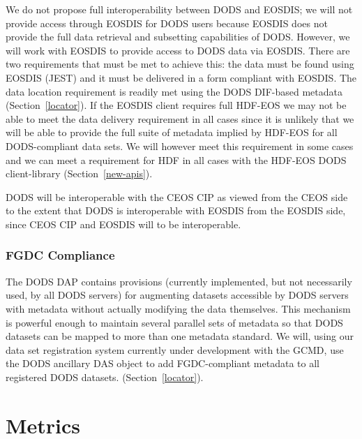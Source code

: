 \documentclass[12pt]{article}
\begin{document}
We do not propose full interoperability between \ac{DODS} and \acs{EOSDIS};
we will not provide access through \acs{EOSDIS} for \ac{DODS} users because
\acs{EOSDIS} does not provide the full data retrieval and subsetting
capabilities of \ac{DODS}.  However, we will work with \acs{EOSDIS} to
provide access to \ac{DODS} data via \acs{EOSDIS}.  There are two
requirements that must be met to achieve this: the data must be found using
\acs{EOSDIS} (JEST) and it must be delivered in a form compliant with
\acs{EOSDIS}.  The data location requirement is readily met using the
\ac{DODS} \ac{DIF}-based metadata (Section~\ref{locator}). If the
\acs{EOSDIS} client requires full \acs{HDF-EOS} we may not be able to meet
the data delivery requirement in all cases since it is unlikely that we will
be able to provide the full suite of metadata implied by \acs{HDF-EOS} for all
\ac{DODS}-compliant data sets. We
will however meet this requirement in some cases and we can meet a
requirement for \acs{HDF} in all cases with the \acs{HDF-EOS} \ac{DODS}
client-library (Section~\ref{new-apis}).

\ac{DODS} will be interoperable with the \ac{CEOS} \ac{CIP} as viewed
from the \ac{CEOS} side to the extent that \ac{DODS} is interoperable 
with \acs{EOSDIS} from the \acs{EOSDIS} side, since \ac{CEOS} \ac{CIP}
and \acs{EOSDIS} will to be interoperable.

\subsubsection{FGDC Compliance}\label{fgdc-compliance}

The \ac{DODS} \ac{DAP} contains provisions (currently implemented, 
but not necessarily used, by all \ac{DODS} servers) for augmenting 
datasets accessible by \ac{DODS} servers with metadata without actually 
modifying the data themselves.  This mechanism is powerful enough to 
maintain several parallel sets of metadata so that \ac{DODS} datasets 
can be mapped to more than one metadata standard. We will, using our 
data set registration system currently under development with the
\ac{GCMD}, use the \ac{DODS} ancillary \ac{DAS} object to add 
\ac{FGDC}-compliant metadata to all registered \ac{DODS} datasets. 
(Section~\ref{locator}).

\section{Metrics}\label{metrics}
\end{document}
